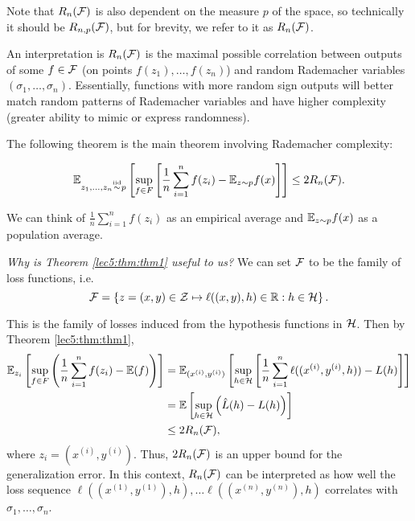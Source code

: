 \begin{remark}
Note that $R_n(\mathcal F)$ is also dependent on the measure $p$ of the space, so technically it should be $R_{n,p}(\mathcal F)$, but for brevity, we refer to it as $R_n(\mathcal F)$.
\end{remark}

An interpretation is $R_n(\mathcal F)$ is the maximal possible correlation between outputs of some $f \in \mathcal F$ (on points $f(z_1), \dots, f(z_n)$) and random Rademacher variables $ (\sigma_1, \dots, \sigma_n).$ Essentially, functions with more random sign outputs will better match random patterns of Rademacher variables and have higher complexity (greater ability to mimic or express randomness).

The following theorem is the main theorem involving Rademacher complexity:

\begin{theorem} \label{lec5:thm:thm1}
    \begin{align}
       {\mathbb E}_{z_1, \dots, z_n \overset{\textup{iid}}{\sim} p} \left[ \sup_{f\in F} \left[ \frac{1}{n} \sum^n_{i=1} f(z_i) -  \mathbb E_{z\sim p} f(x) \right]\right] \leq 2 R_n(\mathcal F). \label{lec5:eqn:thm1}
    \end{align}
\end{theorem}

\begin{remark}
We can think of $\frac{1}{n} \sum^n_{i=1} f(z_i)$ as an empirical average and $\mathbb E_{z\sim p} f(x)$ as a population average.
\end{remark}

\textit{Why is Theorem \ref{lec5:thm:thm1} useful to us?} We can set $\mathcal F$ to be the family of loss functions, i.e.
\begin{equation}
\mathcal F = \left\{ z = (x,y) \in \mathcal Z \mapsto \ell((x,y),h) \in \mathbb R : h \in \mathcal H \right\}.
\end{equation}

This is the family of losses induced from the hypothesis functions in $\mathcal H$. Then by Theorem \ref{lec5:thm:thm1},
\begin{align}
    \mathbb E_{z_i} \left[\sup_{f \in F} \left(\frac{1}{n} \sum^n_{i=1} f(z_i) - \mathbb E(f)\right)\right] 
    &= {\mathbb E}_{(x^{(i)}, y^{(i)})} \left[ \sup_{h \in \mathcal H} \left[\frac{1}{n} \sum^n_{i=1} \ell((x^{(i)}, y^{(i)}, h)) -L(h)\right] \right] \\
    &= \mathbb E\left[ \sup_{h \in \mathcal H}\left( \hat L (h) - L(h) \right) \right] \\
    &\leq 2 R_n(\mathcal F),
\end{align}
where $z_i = (x^{(i)}, y^{(i)})$. Thus, $2R_n(\mathcal F)$ is an upper bound for the generalization error. In this context, $R_n(\mathcal F)$ can be interpreted as how well the loss sequence $\ell((x^{(1)}, y^{(1)}), h), \dots \ell((x^{(n)}, y^{(n)}), h)$ correlates with $\sigma_1, \dots, \sigma_n$.

